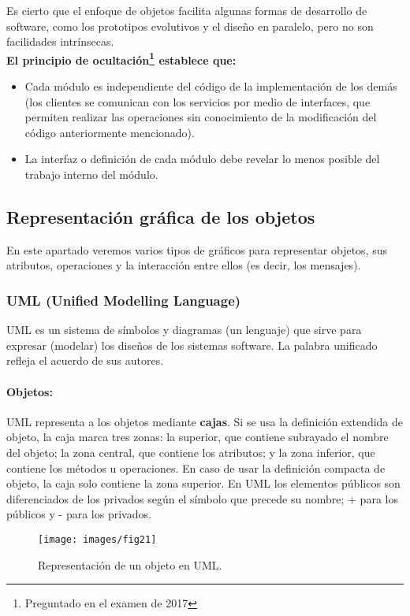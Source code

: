 Es cierto que el enfoque de objetos facilita algunas formas de
desarrollo de software, como los prototipos evolutivos y el diseño en
paralelo, pero no son facilidades intrínsecas.\\
\textbf{El principio de ocultación\footnote{Preguntado en el examen de 2017} establece que:}
\begin{itemize}
\item Cada módulo es independiente del código de la implementación
  de los demás (los clientes se comunican con los servicios por
  medio de interfaces, que permiten realizar las operaciones sin
  conocimiento de la modificación del código anteriormente
  mencionado).
\item La interfaz o definición de cada módulo debe revelar lo menos
  posible del trabajo interno del módulo.
\end{itemize}

\subsection{Representación gráfica de los objetos}
En este apartado veremos varios tipos de gráficos para representar
objetos, sus atributos, operaciones y la interacción entre ellos (es
decir, los mensajes).
\subsubsection{UML (Unified Modelling Language)}
UML es un sistema de símbolos y diagramas (un lenguaje) que sirve para
expresar (modelar) los diseños de los sistemas software. La palabra
unificado refleja el acuerdo de sus autores.

\paragraph{Objetos:}
UML representa a los objetos mediante \textbf{cajas}. Si se usa la
definición extendida de objeto, la caja marca tres zonas: la superior,
que contiene subrayado el nombre del objeto; la zona central, que contiene
los atributos; y la zona inferior, que contiene los métodos u operaciones. En caso de usar
la definición compacta de objeto, la caja solo contiene la zona
superior. En UML los elementos públicos son diferenciados de los
privados según el símbolo que precede su nombre; \textrm{+} para los públicos
y \textrm{-} para los privados.

\begin{figure}[ht!]  \centering
  \texttt{[image: images/fig21]}
  \caption{Representación de un objeto en UML.}
  \label{fig:21}
\end{figure}

